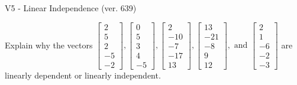 \begin{exercise}
  \begin{exerciseTitle}V5 - Linear Independence (ver. 639)\end{exerciseTitle}
  \begin{exerciseStatement}
    Explain why the vectors \(\left[\begin{array}{r}
2 \\
5 \\
2 \\
-5 \\
-2
\end{array}\right] , \left[\begin{array}{r}
0 \\
5 \\
3 \\
4 \\
-5
\end{array}\right] , \left[\begin{array}{r}
2 \\
-10 \\
-7 \\
-17 \\
13
\end{array}\right] , \left[\begin{array}{r}
13 \\
-21 \\
-8 \\
9 \\
12
\end{array}\right] , \text{ and } \left[\begin{array}{r}
2 \\
1 \\
-6 \\
-2 \\
-3
\end{array}\right]\) are linearly dependent or linearly independent.	



\end{exerciseStatement}
\end{exercise}
